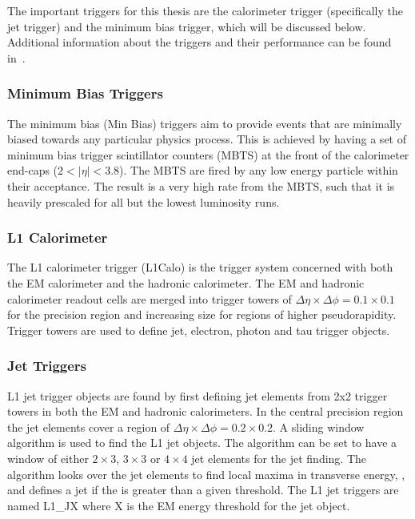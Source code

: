 The important triggers for this thesis are the calorimeter trigger (specifically the jet trigger) and the minimum bias trigger, which will be discussed below.
Additional information about the triggers and their performance can be found in~\cite{ref:TriggerPerf}.

\subsubsection{Minimum Bias Triggers}
The minimum bias (Min Bias) triggers aim to provide events that are minimally biased towards any particular physics process. 
This is achieved by having a set of minimum bias trigger scintillator counters (MBTS) at the front of the calorimeter end-caps ($2<|\eta|<3.8$). 
The MBTS are fired by any low energy particle within their acceptance. 
The result is a very high rate from the MBTS, such that it is heavily prescaled for all but the lowest luminosity runs. 


\subsubsection{L1 Calorimeter}
The L1 calorimeter trigger (L1Calo) is the trigger system concerned with both the EM calorimeter and the hadronic calorimeter. 
The EM and hadronic calorimeter readout cells are merged into trigger towers of $\Delta\eta \times \Delta\phi = 0.1 \times 0.1$ for the precision region and increasing size for regions of higher pseudorapidity. 
Trigger towers are used to define jet, electron, photon and tau trigger objects.

\subsubsection{Jet Triggers}

L1 jet trigger objects are found by first defining jet elements from 2x2 trigger towers in both the EM and hadronic calorimeters.
In the central precision region the jet elements cover a region of $\Delta\eta \times \Delta\phi = 0.2\times 0.2$. 
A sliding window algorithm is used to find the L1 jet objects. 
The algorithm can be set to have a window of either $2\times3$, $3\times3$ or $4\times4$ jet elements for the jet finding. 
The algorithm looks over the jet elements to find local maxima in transverse energy, \et{}, and defines a jet if the \et{} is  greater than a given threshold. 
The L1 jet triggers are named L1\_JX where X is the EM energy threshold for the jet object.

